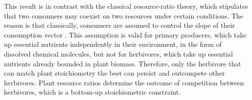 \documentclass[12pt]{article}
\begin{document}
\par
This result is in contrast with the classical resource-ratio theory, which stipulates that two consumers may coexist on two resources under certain conditions. The reason is that classically, consumers are assumed to control the slope of their consumption vector \citep{Tilman1982}. This assumption is valid for primary producers, which take up essential nutrients independently in their environment, in the form of dissolved chemical molecules, but not for herbivores, which take up essential nutrients already bounded in plant biomass. Therefore, %
only the herbivore that can match plant stoichiometry the best can persist and outcompete other herbivores. Plant resource ratios determine the outcome of competition between herbivores, which is a bottom-up stoichiometric constraint. 
\par
\end{document}
